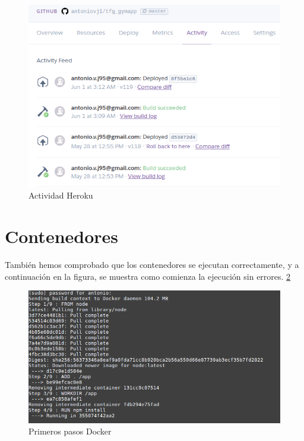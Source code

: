 \begin{figure}
  \begin{center}
    \includegraphics[width=\textwidth]{imagenes/heroku.png}
    \caption{Actividad Heroku}
    \label{fig:heroku}
  \end{center}
\end{figure}

\section {Contenedores}
También hemos comprobado que los contenedores se ejecutan correctamente, y a continuación en la figura, se muestra como comienza la ejecución sin errores. \ref{fig:docker}
\begin{figure}
  \begin{center}
    \includegraphics[width=\textwidth]{imagenes/docker.png}
    \caption{Primeros pasos Docker}
    \label{fig:docker}
  \end{center}
\end{figure}

